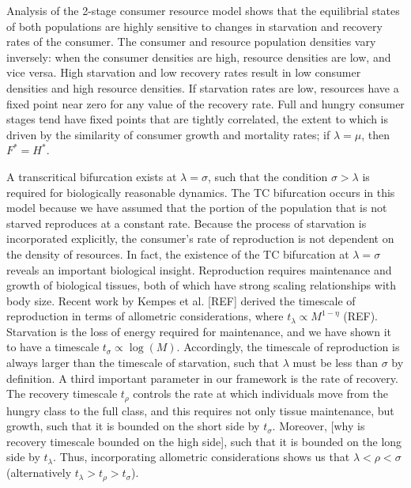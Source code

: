 \documentclass[12pt,english]{article}
\begin{document}
\begin{spacing}{1.9}
Analysis of the 2-stage consumer resource model shows that the equilibrial states of both populations are highly sensitive to changes in  starvation and recovery rates of the consumer.
The consumer and resource population densities vary inversely: when the consumer densities are high, resource densities are low, and vice versa.
High starvation and low recovery rates result in low consumer densities and high resource densities. %
If starvation rates are low, resources have a fixed point near zero for any value of the recovery rate.
Full and hungry consumer stages tend have fixed points that are tightly correlated, the extent to which is driven by the similarity of consumer growth and mortality rates; if $\lambda = \mu$, then $F^* = H^*$.

A transcritical bifurcation exists at $\lambda = \sigma$, such that the condition $\sigma > \lambda$ is required for biologically reasonable dynamics.
The TC bifurcation occurs in this model because we have assumed that the portion of the population that is not starved reproduces at a constant rate.
Because the process of starvation is incorporated explicitly, the consumer's rate of reproduction is not dependent on the density of resources.
In fact, the existence of the TC bifurcation at $\lambda = \sigma$ reveals an important biological insight. 
Reproduction requires maintenance and growth of biological tissues, both of which have strong scaling relationships with body size.
Recent work by Kempes et al. [REF] derived the timescale of reproduction in terms of allometric considerations, where $t_\lambda \propto M^{1-\eta}$ (REF).
Starvation is the loss of energy required for maintenance, and we have shown it to have a timescale $t_\sigma \propto \log(M)$.
Accordingly, the timescale of reproduction is always larger than the timescale of starvation, such that $\lambda$ must be less than $\sigma$ by definition.
A third important parameter in our framework is the rate of recovery.
The recovery timescale $t_\rho$ controls the rate at which individuals move from the hungry class to the full class, and this requires not only tissue maintenance, but growth, such that it is bounded on the short side by $t_\sigma$.
Moreover, [why is recovery timescale bounded on the high side], such that it is bounded on the long side by $t_\lambda$.
Thus, incorporating allometric considerations shows us that $\lambda < \rho < \sigma$ (alternatively $t_\lambda > t_\rho > t_\sigma$).


\end{spacing}
\end{document}
